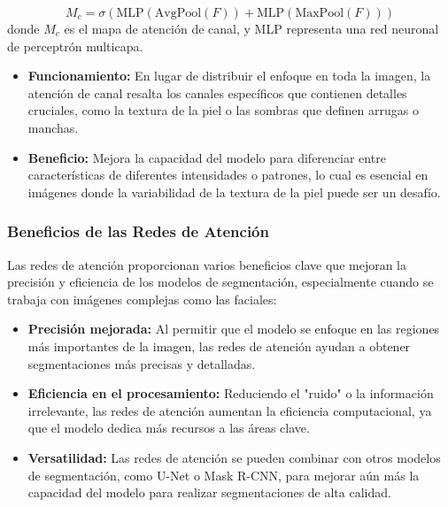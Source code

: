 \begin{equation}\label{eq:mapa_atencion_canal}
    M_c = \sigma(\text{MLP}(\text{AvgPool}(F)) + \text{MLP}(\text{MaxPool}(F)))
\end{equation}
donde $M_c$ es el mapa de atención de canal, y MLP representa una red neuronal de perceptrón multicapa.


\begin{itemize}
    \item \textbf{Funcionamiento:} En lugar de distribuir el enfoque en toda la imagen, la atención de canal resalta los canales específicos que contienen detalles cruciales, como la textura de la piel o las sombras que definen arrugas o manchas. \parencite{autor2019canal}
    \item \textbf{Beneficio:} Mejora la capacidad del modelo para diferenciar entre características de diferentes intensidades o patrones, lo cual es esencial en imágenes donde la variabilidad de la textura de la piel puede ser un desafío. \parencite{autor2019canal}
\end{itemize}

\subsubsection{Beneficios de las Redes de Atención}  
Las redes de atención proporcionan varios beneficios clave que mejoran la precisión y eficiencia de los modelos de segmentación, especialmente cuando se trabaja con imágenes complejas como las faciales:
\begin{itemize}
    \item \textbf{Precisión mejorada:} Al permitir que el modelo se enfoque en las regiones más importantes de la imagen, las redes de atención ayudan a obtener segmentaciones más precisas y detalladas. \parencite{autor2021beneficios}
    \item \textbf{Eficiencia en el procesamiento:} Reduciendo el "ruido" o la información irrelevante, las redes de atención aumentan la eficiencia computacional, ya que el modelo dedica más recursos a las áreas clave. \parencite{autor2021beneficios}
    \item \textbf{Versatilidad:} Las redes de atención se pueden combinar con otros modelos de segmentación, como U-Net o Mask R-CNN, para mejorar aún más la capacidad del modelo para realizar segmentaciones de alta calidad. \parencite{autor2021beneficios}
\end{itemize}

